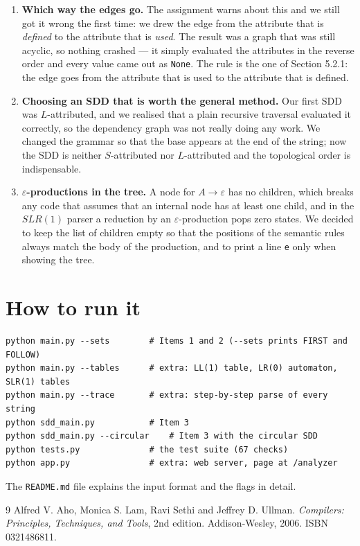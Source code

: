 \documentclass[11pt]{article}
\begin{document}
\begin{enumerate}
  \item \textbf{Which way the edges go.} The assignment warns about this and we still
        got it wrong the first time: we drew the edge from the attribute that is
        \emph{defined} to the attribute that is \emph{used}. The result was a graph that
        was still acyclic, so nothing crashed --- it simply evaluated the attributes in
        the reverse order and every value came out as \texttt{None}. The rule is the one
        of Section 5.2.1: the edge goes from the attribute that is used to the attribute
        that is defined.

  \item \textbf{Choosing an SDD that is worth the general method.} Our first SDD was
        $L$-attributed, and we realised that a plain recursive traversal evaluated it
        correctly, so the dependency graph was not really doing any work. We changed the
        grammar so that the base appears at the end of the string; now the SDD is neither
        $S$-attributed nor $L$-attributed and the topological order is indispensable.

  \item \textbf{$\varepsilon$-productions in the tree.} A node for
        $A \rightarrow \varepsilon$ has no children, which breaks any code that assumes
        that an internal node has at least one child, and in the $SLR(1)$ parser a
        reduction by an $\varepsilon$-production pops zero states. We decided to keep the
        list of children empty so that the positions of the semantic rules always match
        the body of the production, and to print a line \texttt{e} only when showing the
        tree.
\end{enumerate}

\section{How to run it}

\begin{center}
\small
\begin{verbatim}
python main.py --sets        # Items 1 and 2 (--sets prints FIRST and FOLLOW)
python main.py --tables      # extra: LL(1) table, LR(0) automaton, SLR(1) tables
python main.py --trace       # extra: step-by-step parse of every string
python sdd_main.py           # Item 3
python sdd_main.py --circular    # Item 3 with the circular SDD
python tests.py              # the test suite (67 checks)
python app.py                # extra: web server, page at /analyzer
\end{verbatim}
\end{center}

The \texttt{README.md} file explains the input format and the flags in detail.

\begin{thebibliography}{9}
Alfred V. Aho, Monica S. Lam, Ravi Sethi and Jeffrey D. Ullman.
\emph{Compilers: Principles, Techniques, and Tools}, 2nd edition.
Addison-Wesley, 2006. ISBN 0321486811.
\end{thebibliography}
\end{document}
